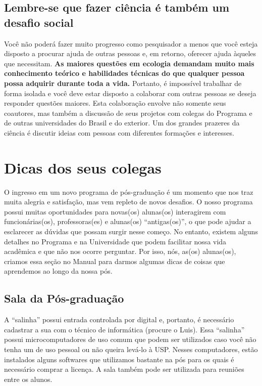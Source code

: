 \documentclass[twoside a4paper 12pt]{report}
\begin{document}
\section{Lembre-se que fazer ciência é também um desafio social}

Você não poderá fazer muito progresso como pesquisador a menos que
você esteja disposto a procurar ajuda de outras pessoas e, em retorno,
oferecer ajuda àqueles que necessitam. \textbf{As maiores questões em
  ecologia demandam muito mais conhecimento teórico e habilidades
  técnicas do que qualquer pessoa possa adquirir durante toda a vida.}
Portanto, é impossível trabalhar de forma isolada e você deve estar
disposto a colaborar com outras pessoas se deseja responder questões
maiores. Esta colaboração envolve não somente seus coautores, mas
também a discussão de seus projetos com colegas do Programa e de
outras universidades do Brasil e do exterior. Um dos grandes prazeres
da ciência é discutir ideias com pessoas com diferentes formações e
interesses.


\chapter[Dicas dos alunos]{Dicas dos seus colegas}

O ingresso em um novo programa de pós-graduação é um momento que nos
traz muita alegria e satisfação, mas vem repleto de novos desafios. O
nosso programa possui muitas oportunidades para novas(os) alunas(os)
interagirem com funcionárias(os), professoras(es) e alunas(os)
``antigas(os)'', o que pode ajudar a esclarecer as dúvidas que possam
surgir nesse começo. No entanto, existem alguns detalhes no Programa e
na Universidade que podem facilitar nossa vida acadêmica e que não nos
ocorre perguntar. Por isso, nós, as(os) alunas(os), criamos essa seção
no Manual para darmos algumas dicas de coisas que aprendemos ao longo
da nossa pós.


\section{Sala da Pós-graduação}\label{sala-da-posgraduaucao}

A ``salinha'' possui entrada controlada por digital e, portanto, é
necessário cadastrar a sua com o técnico de informática (procure o
Luis). Essa ``salinha'' possui microcomputadores de uso comum que podem
ser utilizados caso você não tenha um de uso pessoal ou não queira
levá-lo à USP. Nesses computadores, estão instalados alguns softwares
que utilizamos bastante na pós para os quais é necessário comprar a
licença. A sala também pode ser utilizada para reuniões entre os
alunos.
\end{document}
